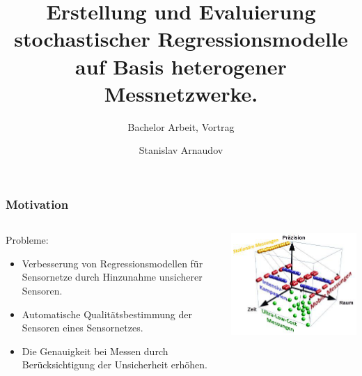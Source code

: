\documentclass[18pt]{beamer}
\title[Short title]{Erstellung und Evaluierung stochastischer Regressionsmodelle auf Basis heterogener Messnetzwerke.}
\subtitle{Bachelor Arbeit, Vortrag}
\author{Stanislav Arnaudov}
\institute{TECO - Das Telecooperation Office}
\begin{document}
 



\begin{frame}
 \titlepage
\end{frame}

\begin{frame}
  \frametitle{Motivation}
  
  \begin{columns}
    \begin{column}{0.4\textwidth}
      Probleme:
      \begin{itemize}
      \item Verbesserung von Regressionsmodellen für Sensornetze  durch Hinzunahme unsicherer Sensoren.
      \item Automatische Qualitätsbestimmung der Sensoren eines Sensornetzes.
      \item Die Genauigkeit bei Messen durch Berücksichtigung der Unsicherheit erhöhen.
      \end{itemize}
    \end{column}
    \begin{column}{0.6\textwidth}
      \begin{center}
        \includegraphics[scale=0.5]{images/motivation}
      \end{center}
    \end{column}
  \end{columns}
  
\end{frame}
\end{document}
